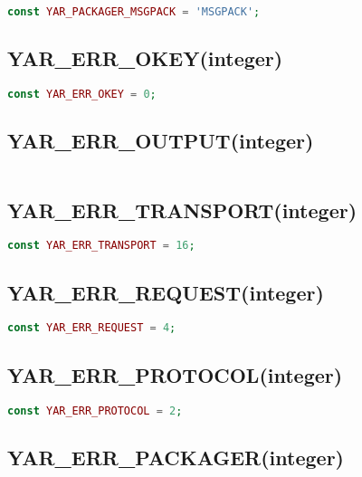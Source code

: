 \begin{lstlisting}[language=PHP]
const YAR_PACKAGER_MSGPACK = 'MSGPACK';
\end{lstlisting}

\subsection{YAR\_ERR\_OKEY(integer)}

\begin{lstlisting}[language=PHP]
const YAR_ERR_OKEY = 0;
\end{lstlisting}

\subsection{YAR\_ERR\_OUTPUT(integer)}

\begin{lstlisting}[language=PHP]

\end{lstlisting}

\subsection{YAR\_ERR\_TRANSPORT(integer)}

\begin{lstlisting}[language=PHP]
const YAR_ERR_TRANSPORT = 16;
\end{lstlisting}

\subsection{YAR\_ERR\_REQUEST(integer)}

\begin{lstlisting}[language=PHP]
const YAR_ERR_REQUEST = 4;
\end{lstlisting}

\subsection{YAR\_ERR\_PROTOCOL(integer)}

\begin{lstlisting}[language=PHP]
const YAR_ERR_PROTOCOL = 2;
\end{lstlisting}

\subsection{YAR\_ERR\_PACKAGER(integer)}


